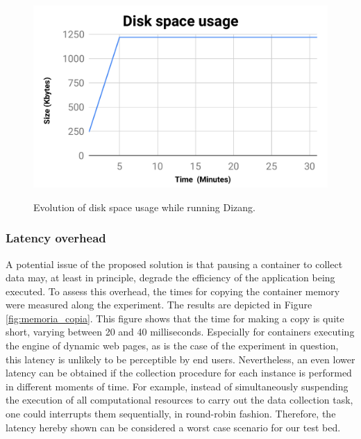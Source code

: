 \documentclass[conference]{IEEEtran}
\newcommand{\marcos}[1]{{\color{green}{MARCOS: #1}}}
\newcommand{\fancyname}{Dizang}
\begin{document}
\begin{figure}[htb!]
\footnotesize
\caption{Evolution of disk space usage while running \fancyname. 
}
\includegraphics[center,scale=0.40]{evolucao_coleta_ieee.pdf}
\centering
\label{fig:evolucao_coleta}
\end{figure}


\subsubsection{Latency overhead}
A potential issue of the proposed solution is that pausing a container to collect data may, at least in principle, degrade the efficiency of the application being executed.
%
To assess this overhead, the times for copying the container memory were measured along the experiment.
%
The results are depicted in Figure \ref{fig:memoria_copia}.
%
This figure shows that the time for making a copy is quite short, varying between 20 and 40 milliseconds. 
%
Especially for containers executing the engine of dynamic web pages, as is the case of the experiment in question, this latency is unlikely to be perceptible by end users.
%
Nevertheless, an even lower latency can be obtained if the collection procedure for each instance is performed in different moments of time.
%
For example, instead of simultaneously suspending the execution of all computational resources to carry out the data collection task, one could interrupts them sequentially, in round-robin fashion.
%
Therefore, the latency hereby shown can be considered a worst case scenario for our test bed.
\end{document}
